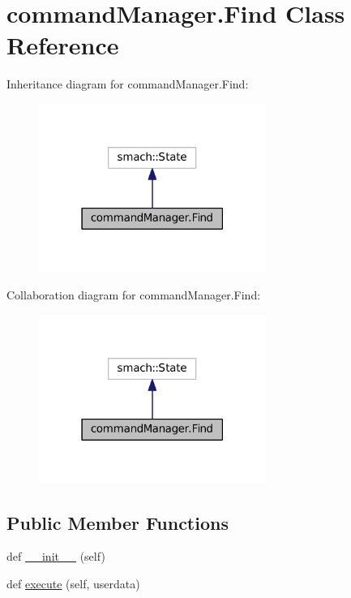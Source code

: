 \hypertarget{classcommandManager_1_1Find}{}\section{command\+Manager.\+Find Class Reference}
\label{classcommandManager_1_1Find}


Inheritance diagram for command\+Manager.\+Find\+:\nopagebreak
\begin{figure}[H]
\begin{center}
\leavevmode
\includegraphics[width=210pt]{classcommandManager_1_1Find__inherit__graph}
\end{center}
\end{figure}


Collaboration diagram for command\+Manager.\+Find\+:\nopagebreak
\begin{figure}[H]
\begin{center}
\leavevmode
\includegraphics[width=210pt]{classcommandManager_1_1Find__coll__graph}
\end{center}
\end{figure}
\subsection*{Public Member Functions}
\begin{DoxyCompactItemize}
\item 
def \hyperlink{classcommandManager_1_1Find_ae547a564eeb683ea6d439cd8d0508779}{\+\_\+\+\_\+init\+\_\+\+\_\+} (self)
\item 
def \hyperlink{classcommandManager_1_1Find_aef4287ee7b2f43741e7dfd8d19b42878}{execute} (self, userdata)
\end{DoxyCompactItemize}
